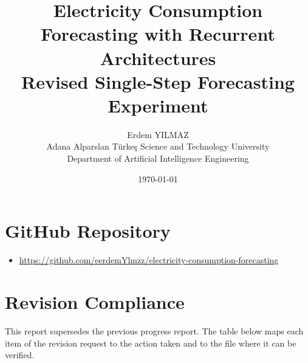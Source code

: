 \documentclass[11pt,a4paper]{article}
\title{Electricity Consumption Forecasting with Recurrent Architectures\\
\large Revised Single-Step Forecasting Experiment}
\author{Erdem YILMAZ \\
Adana Alparslan T\"urke\c{s} Science and Technology University \\
Department of Artificial Intelligence Engineering}
\date{\today}
\begin{document}
\maketitle

\section{GitHub Repository}

\begin{itemize}
  \item \url{https://github.com/eerdemYlmzz/electricity-consumption-forecasting}
\end{itemize}


\section{Revision Compliance}

This report supersedes the previous progress report. The table below maps each item of the
revision request to the action taken and to the file where it can be verified.
\end{document}
